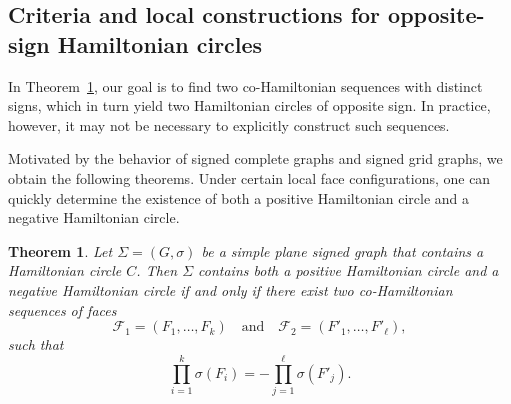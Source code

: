 \documentclass[12pt]{amsart}
\theoremstyle{theorem}%
\newtheorem{theorem}{Theorem}[section]
\theoremstyle{definition}%
\begin{document}
\subsection{Criteria and local constructions for opposite-sign Hamiltonian circles}
 In Theorem~\ref{thm111}, our goal is to find two co-Hamiltonian sequences with distinct signs, which in turn
yield two Hamiltonian circles of opposite sign.  In practice, however, it may not be necessary to explicitly
construct such sequences.

Motivated by the behavior of signed complete graphs and signed grid graphs, we obtain the following theorems.
Under certain local face configurations, one can quickly determine the existence of both a positive Hamiltonian
circle and a negative Hamiltonian circle.











\begin{theorem}\label{thm111}
Let $\Sigma=(G,\sigma)$ be a simple plane signed graph that contains a Hamiltonian circle $C$.
Then $\Sigma$ contains both a positive Hamiltonian circle and a negative Hamiltonian circle
if and only if there exist two co-Hamiltonian sequences of faces
\[
\mathcal{F}_1 = (F_1,\dots,F_k)
\quad\text{and}\quad
\mathcal{F}_2 = (F'_1,\dots,F'_\ell),
\]
such that
\[
\prod_{i=1}^{k} \sigma(F_i)=-\prod_{j=1}^{\ell} \sigma(F'_j).
\]
\end{theorem}
\end{document}
